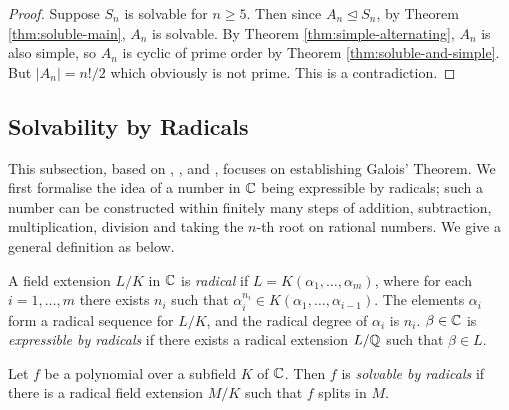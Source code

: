 \begin{proof}
	Suppose $S_n$ is solvable for $n \ge 5$. Then since $A_n \trianglelefteq S_n$, by Theorem \ref{thm:soluble-main}, $A_n$ is solvable. By Theorem \ref{thm:simple-alternating}, $A_n$ is also simple, so $A_n$ is cyclic of prime order by Theorem \ref{thm:soluble-and-simple}. But $|A_n| = n! / 2$ which obviously is not prime. This is a contradiction.
\end{proof}








\subsection{Solvability by Radicals}
This subsection, based on \cite[Chapter~15]{Stewart}, \cite[p.~71-75]{  rotman_galois_1998}, \cite[Section~9]{introduction-to-galois-theory} and \cite{cambridge-galois-lecture-polynomials}, focuses on establishing Galois' Theorem. We first formalise the idea of a number in $\mathbb C$ being expressible by radicals; such a number can be constructed within finitely many steps of addition, subtraction, multiplication, division and taking the $n$-th root on rational numbers. We give a general definition as below. 
\begin{definition} \label{def:radical-extension}
	A field extension $L / K$ in $\mathbb C$ is \textit{radical} if $L=K\left(\alpha_1, \ldots, \alpha_m\right)$, where for each $i=1, \ldots, m$ there exists $n_i$ such that
	$
	\alpha_i^{n_i} \in K\left(\alpha_1, \ldots, \alpha_{i-1}\right).
	$
	The elements $\alpha_i$ form a radical sequence for $L / K$, and the radical degree of $\alpha_i$ is $n_i$.  $\beta \in \mathbb C$ is \textit{expressible by radicals} if there exists a radical extension $L / \mathbb Q$ such that $\beta \in L$. 
\end{definition}

\begin{definition}
	Let $f$ be a polynomial over a subfield $K$ of $\mathbb C$. Then $f$ is \textit{solvable by radicals} if there is a radical field extension $M/K$ such that $f$ splits in $M$. 
\end{definition}

